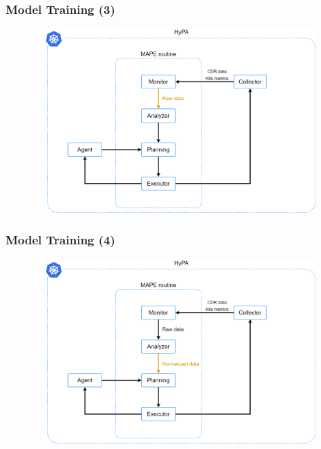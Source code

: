 \documentclass[11pt,t,usepdftitle=false,aspectratio=169]{beamer}
\begin{document}
\begin{frame}
	\frametitle{Model Training (3)}
	
	\begin{figure}
		\centering
		\vspace*{-0.4cm}
		\includegraphics[width=12cm,height=7cm]{_images/trainings_model_2.png}
	\end{figure}
\end{frame}

\begin{frame}
	\frametitle{Model Training (4)}
	
	\begin{figure}
		\centering
		\vspace*{-0.4cm}
		\includegraphics[width=12cm,height=7cm]{_images/trainings_model_3.png}
	\end{figure}
\end{frame}
\end{document}

